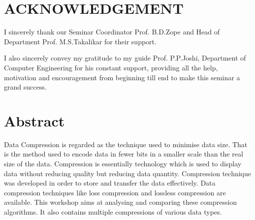 \documentclass[a4paper, 12pt]{article}
\begin{document}
\section*{ACKNOWLEDGEMENT}

\hspace{0.5cm} I sincerely thank our Seminar Coordinator Prof. B.D.Zope and Head of Department Prof. M.S.Takalikar
for their support.
\vspace{0.25cm}
\par I also sincerely convey my gratitude to my guide Prof. P.P.Joshi, Department of Computer Engineering for his constant
support, providing all the help, motivation and encouragement from beginning till end to make this seminar a grand success.
\vspace{0.25cm}
\par 

\newpage
\tableofcontents

\newpage
\listoffigures

\newpage

\section*{Abstract}
Data Compression is regarded as the technique used to minimise data size. That is the method used to encode data in fewer bits in a smaller scale than the real size of the data. Compression is essentially technology which is used to display data without reducing quality but reducing data quantity. Compression technique was developed in order to store and transfer the data effectively. Data compression techniques like loss compression and lossless compression are available. This workshop aims at analysing and comparing these compression algorithms. It also contains multiple compressions of various data types.
\par
\end{document}
